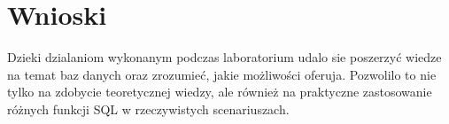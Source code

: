 \documentclass[a4paper, 10pt]{article}
\begin{document}
\section{Wnioski}
Dzieki dzialaniom wykonanym podczas laboratorium udalo sie poszerzyć wiedze na temat baz danych oraz zrozumieć, jakie możliwości oferuja. Pozwolilo to nie tylko na zdobycie teoretycznej wiedzy, ale również na praktyczne zastosowanie różnych funkcji SQL w rzeczywistych scenariuszach.
\end{document}
